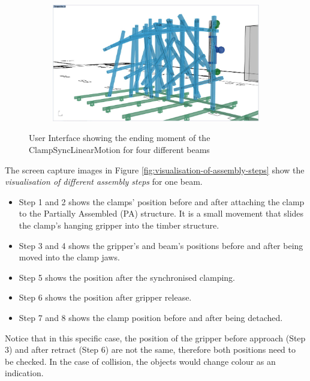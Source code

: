 \begin{figure}[!h]
\begin{subfigure}[b]{0.49\textwidth}
    \end{subfigure}
    \hfill
    \begin{subfigure}[b]{0.49\textwidth}
        \centering
        \includegraphics[width=\textwidth]{images/6a/img45.jpg}
    \end{subfigure}
    \caption{User Interface showing the ending moment of the ClampSyncLinearMotion for four different beams}
    \label{fig:clamp_sync_linear_motion}
\end{figure}

\FloatBarrier

The screen capture images in Figure \ref{fig:visualisation-of-assembly-steps} show the \textit{visualisation of different assembly steps} for one beam.

\begin{itemize}
	\item Step 1 and 2 shows the clamps’ position before and after attaching the clamp to the Partially Assembled (PA) structure. It is a small movement that slides the clamp's hanging gripper into the timber structure.
	\item Step 3 and 4 shows the gripper’s and beam’s positions before and after being moved into the clamp jaws.
	\item Step 5 shows the position after the synchronised clamping.
	\item Step 6 shows the position after gripper release.
	\item Step 7 and 8 shows the clamp position before and after being detached.
\end{itemize}

Notice that in this specific case, the position of the gripper before approach (Step 3) and after retract (Step 6) are not the same, therefore both positions need to be checked. In the case of collision, the objects would change colour as an indication.


